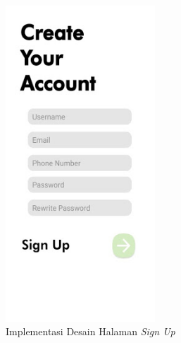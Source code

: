 \begin{figure} [!ht]
  \centering
  \includegraphics[width=0.5\textwidth]{gambar/signup.jpg}
  \caption{Implementasi Desain Halaman \textit{Sign Up}}
  \label{fig:signup_impl}
\end{figure}